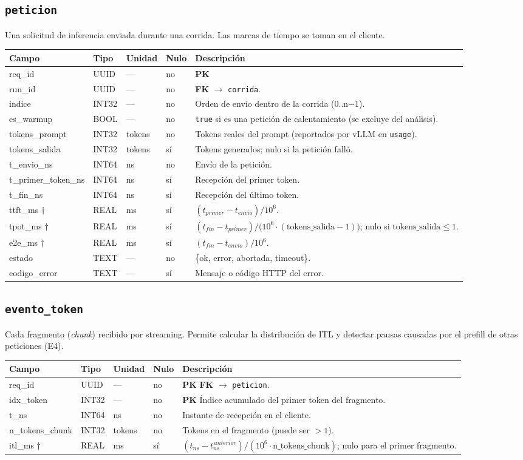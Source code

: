 \documentclass[11pt,a4paper]{article}
\makeatletter
\newcommand{\PK}{\textcolor{pkc}{\textbf{PK}}}
\newcommand{\FK}{\textcolor{fkc}{\textbf{FK}}}
\newenvironment{diccionario}{%
  \small
  \begin{longtable}{@{}>{\raggedright\ttfamily}p{3.4cm}>{\raggedright}p{2.2cm}>{\raggedright}p{1.6cm}p{0.9cm}>{\raggedright\arraybackslash}p{5.8cm}@{}}
  \toprule
  \normalfont\textbf{Campo} & \textbf{Tipo} & \textbf{Unidad} & \textbf{Nulo} & \textbf{Descripción}\\
  \midrule\endhead
  \bottomrule\endfoot
}{\end{longtable}}
\makeatother
\begin{document}
\subsection{\texttt{peticion}}
Una solicitud de inferencia enviada durante una corrida. Las marcas de tiempo se toman en el cliente.
\begin{diccionario}
req_id & UUID & — & no & \PK{}\\
run_id & UUID & — & no & \FK{} $\rightarrow$ \texttt{corrida}.\\
indice & INT32 & — & no & Orden de envío dentro de la corrida (0..n$-$1).\\
es_warmup & BOOL & — & no & \texttt{true} si es una petición de calentamiento (se excluye del análisis).\\
tokens_prompt & INT32 & tokens & no & Tokens reales del prompt (reportados por vLLM en \texttt{usage}).\\
tokens_salida & INT32 & tokens & sí & Tokens generados; nulo si la petición falló.\\
t_envio_ns & INT64 & ns & no & Envío de la petición.\\
t_primer_token_ns & INT64 & ns & sí & Recepción del primer token.\\
t_fin_ns & INT64 & ns & sí & Recepción del último token.\\
ttft_ms † & REAL & ms & sí & $(t_{primer} - t_{envio}) / 10^6$.\\
tpot_ms † & REAL & ms & sí & $(t_{fin} - t_{primer}) / \bigl(10^6 \cdot (\text{tokens\_salida} - 1)\bigr)$; nulo si $\text{tokens\_salida} \le 1$.\\
e2e_ms † & REAL & ms & sí & $(t_{fin} - t_{envio}) / 10^6$.\\
estado & TEXT & — & no & \{ok, error, abortada, timeout\}.\\
codigo_error & TEXT & — & sí & Mensaje o código HTTP del error.\\
\end{diccionario}

\subsection{\texttt{evento_token}}
Cada fragmento (\emph{chunk}) recibido por streaming. Permite calcular la distribución de ITL y detectar pausas causadas por el prefill de otras peticiones (E4).
\begin{diccionario}
req_id & UUID & — & no & \PK{} \FK{} $\rightarrow$ \texttt{peticion}.\\
idx_token & INT32 & — & no & \PK{} Índice acumulado del primer token del fragmento.\\
t_ns & INT64 & ns & no & Instante de recepción en el cliente.\\
n_tokens_chunk & INT32 & tokens & no & Tokens en el fragmento (puede ser $>1$).\\
itl_ms † & REAL & ms & sí & $(t_{ns} - t_{ns}^{\,anterior}) / (10^6 \cdot \text{n\_tokens\_chunk})$; nulo para el primer fragmento.\\
\end{diccionario}
\end{document}
